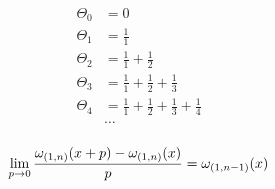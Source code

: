 \begin{equation*} \begin{aligned}
\Theta_0 &= 0 \\
\Theta_1 &= 
  \frac{1}{1} \\
\Theta_2 &= 
  \frac{1}{1} 
+ \frac{1}{2} \\
\Theta_3 &= 
  \frac{1}{1} 
+ \frac{1}{2} 
+ \frac{1}{3} \\
\Theta_4 &= 
  \frac{1}{1} 
+ \frac{1}{2} 
+ \frac{1}{3} 
+ \frac{1}{4} \\
&\ldots \\
\end{aligned} \end{equation*}

\begin{equation*}
\lim_{p \to 0} \frac{\omega_{(1, n)}(x + p) - \omega_{(1, n)}(x)}{p} = \omega_{(1, n - 1)}(x) \\
\end{equation*}
